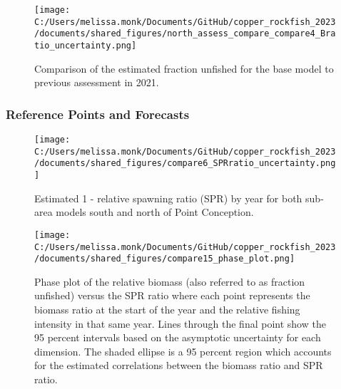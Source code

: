 \documentclass[11pt,
  letterpaper,
]{article}
\begin{document}
\newpage

\begin{figure}
{\centering
\texttt{[image: C:/Users/melissa.monk/Documents/GitHub/copper\_rockfish\_2023/documents/shared\_figures/north\_assess\_compare\_compare4\_Bratio\_uncertainty.png]}
}
\caption{Comparison of the estimated fraction unfished for the base model to previous assessment in 2021.\label{fig:comp-assess-depl}}
\end{figure}

\newpage

\subsubsection{Reference Points and Forecasts}\label{reference-points-and-forecasts}

\begin{figure}
{\centering
\texttt{[image: C:/Users/melissa.monk/Documents/GitHub/copper\_rockfish\_2023/documents/shared\_figures/compare6\_SPRratio\_uncertainty.png]}
}
\caption{Estimated 1 - relative spawning ratio (SPR) by year for both sub-area models south and north of Point Conception.\label{fig:1-spr}}
\end{figure}

\clearpage

\begin{figure}
{\centering
\texttt{[image: C:/Users/melissa.monk/Documents/GitHub/copper\_rockfish\_2023/documents/shared\_figures/compare15\_phase\_plot.png]}
}
\caption{Phase plot of the relative biomass (also referred to as fraction unfished) versus the SPR ratio where each point represents the biomass ratio at the start of the year and the relative fishing intensity in that same year. Lines through the final point show the 95 percent intervals based on the asymptotic uncertainty for each dimension. The shaded ellipse is a 95 percent region which accounts for the estimated correlations between the biomass ratio and SPR ratio.\label{fig:phase}}
\end{figure}

\pagebreak
\end{document}
